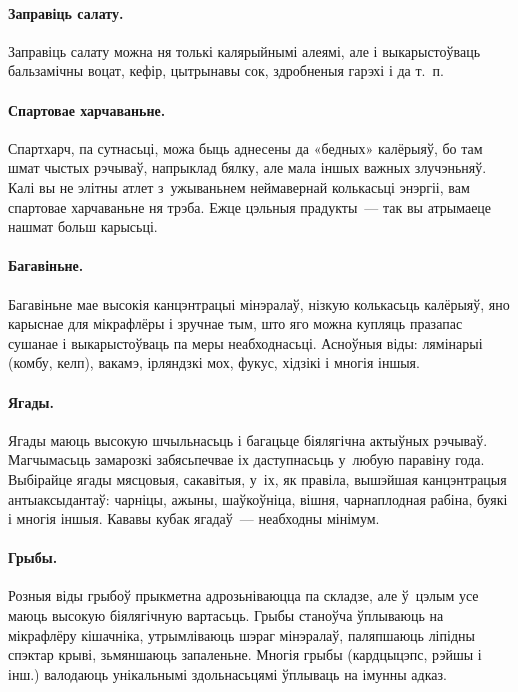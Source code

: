 \paragraph{Заправіць салату.}
Заправіць салату можна ня толькі калярыйнымі алеямі, але і выкарыстоўваць бальзамічны воцат, кефір, цытрынавы сок, здробненыя гарэхі і да т.~п.

\paragraph{Спартовае харчаваньне.}
Спартхарч, па сутнасьці, можа быць аднесены да «бедных» калёрыяў, бо там шмат чыстых рэчываў, напрыклад бялку, але мала іншых важных злучэньняў. Калі вы не элітны атлет з~ужываньнем неймавернай колькасьці энэргіі, вам спартовае харчаваньне ня трэба. Ежце цэльныя прадукты~--- так вы атрымаеце нашмат больш карысьці.

\paragraph{Багавіньне.}
Багавіньне мае высокія канцэнтрацыі мінэралаў, нізкую колькасьць калёрыяў, яно карыснае для мікрафлёры і зручнае тым, што яго можна купляць празапас сушанае і выкарыстоўваць па меры неабходнасьці. Асноўныя віды: лямінарыі (комбу, келп), вакамэ, ірляндзкі мох, фукус, хідзікі і многія іншыя.

\paragraph{Ягады.}
Ягады маюць высокую шчыльнасьць і багацьце біялягічна актыўных рэчываў. Магчымасьць замарозкі забясьпечвае іх даступнасьць у~любую паравіну года. Выбірайце ягады мясцовыя, сакавітыя, у~іх, як правіла, вышэйшая канцэнтрацыя антыаксыдантаў: чарніцы, ажыны, шаўкоўніца, вішня, чарнаплодная рабіна, буякі і многія іншыя. Кававы кубак ягадаў~--- неабходны мінімум.

\paragraph{Грыбы.}
Розныя віды грыбоў прыкметна адрозьніваюцца па складзе, але ў~цэлым усе маюць высокую біялягічную вартасьць. Грыбы станоўча ўплываюць на мікрафлёру кішачніка, утрымліваюць шэраг мінэралаў, паляпшаюць ліпідны спэктар крыві, зьмяншаюць запаленьне. Многія грыбы (кардцыцэпс, рэйшы і інш.) валодаюць унікальнымі здольнасьцямі ўплываць на імунны адказ.


